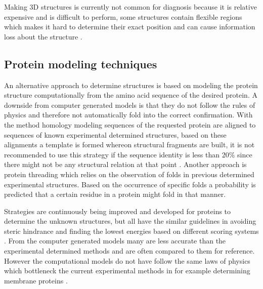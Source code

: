 Making 3D structures is currently not common for diagnosis because it is relative expensive and is difficult to perform, some structures contain flexible regions which makes it hard to determine their exact position and can cause information loss about the structure \cite{pdb101_pdb101:_nodate, ridgen_protein_nodate}.
\label{subsec:GD_Addition_of_structural_data}
\newpage

\subsection{Protein modeling techniques}
An alternative approach to determine structures is based on modeling the protein structure computationally from the amino acid sequence of the desired protein. A downside from computer generated models is that they do not follow the rules of physics and therefore not automatically fold into the correct confirmation. With the method homology modeling sequences of the requested protein are aligned to sequences of known experimental determined structures, based on these alignments a template is formed whereon structural fragments are built, it is not recommended to use this strategy if the sequence identity is less than 20\% since there might not be any structural relation at that point \cite{chothia_relation_1986}.
Another approach is protein threading which relies on the observation of folds in previous determined experimental structures. Based on the occurrence of specific folds a probability is predicted that a certain residue in a protein might fold in that manner. 

Strategies are continuously being improved and developed for proteins to determine the unknown structures, but all have the similar guidelines in avoiding steric hindrance \cite{yonath_x-ray_2011} and finding the lowest energies based on different scoring systems \cite{wikipedia_ramachandran_2019}. From the computer generated models many are less accurate than the experimental determined methods and are often compared to them for reference. However the computational models do not have follow the same laws of physics which bottleneck the current experimental methods in for example determining membrane proteins \cite{shourya_scoring_nodate}.
\label{subsec:GD_Protein_modeling_techniques}

